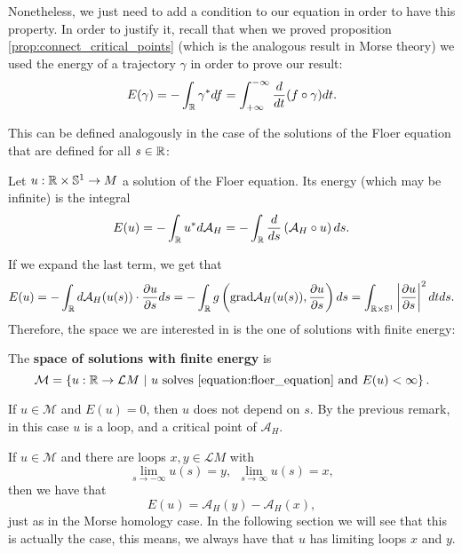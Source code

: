 Nonetheless, we just need to add a condition to our equation in order to have this property. In order to justify it, recall that when we proved proposition \ref{prop:connect_critical_points} (which is the analogous result in Morse theory) we used the energy of a trajectory $\gamma$ in order to prove our result:
$$E(\gamma) = - \int_{\mathbb{R}} \gamma^{\ast} d f = \int_{+\infty}^{-\infty} \frac{d}{d t} (f \circ \gamma) d t .$$

This can be defined analogously in the case of the solutions of the Floer equation that are defined for all $s \in \mathbb{R}$:

\begin{deff} \label{definition:floer_energy}
Let $u : \mathbb{R} \times \mathbb{S}^1 \rightarrow M$ a solution of the Floer equation. Its energy (which may be infinite) is the integral
$$E(u) = - \int_{\mathbb{R}} u^{\ast} d \mathcal{A}_H = - \int_{\mathbb{R}} \frac{d}{d s} \left( \mathcal{A}_H \circ u \right) d s .$$
\end{deff}

If we expand the last term, we get that
$$E(u) = - \int_{\mathbb{R}} d \mathcal{A}_H(u(s)) \cdot \frac{\partial u}{\partial s} d s = - \int_{\mathbb{R}} g \left(\mathrm{grad}\mathcal{A}_H(u(s)),\frac{\partial u}{\partial s} \right) d s = \int_{\mathbb{R} \times \mathbb{S}^1} \left| \frac{\partial u}{\partial s} \right|^2 d t d s .$$
Therefore, the space we are interested in is the one of solutions with finite energy:

\begin{deff} \label{definition:finite_energy_space}
The {\bf space of solutions with finite energy} is
$$\mathcal{M} = \left\{ u : \mathbb{R} \rightarrow \mathcal{L}M \ | \ u \text{ solves \ref{equation:floer_equation} and } E(u) < \infty \right\} .$$
\end{deff}

\begin{rmrk} \label{remark:floer_energy_zero}
If $u \in \mathcal{M}$ and $E(u) = 0$, then $u$ does not depend on $s$. By the previous remark, in this case $u$ is a loop, and a critical point of $\mathcal{A}_H$.
\end{rmrk}

\begin{rmrk} \label{remark:floer_limits}
If $u \in \mathcal{M}$ and there are loops $x,y \in \mathcal{L}M$ with
$$\lim_{s \rightarrow -\infty} u(s) = y, \ \ \lim_{s \rightarrow \infty} u(s) = x ,$$
then we have that
$$E(u) = \mathcal{A}_H(y) - \mathcal{A}_H(x) ,$$
just as in the Morse homology case.
In the following section we will see that this is actually the case, this means, we always have that $u$ has limiting loops $x$ and $y$.
\end{rmrk}
